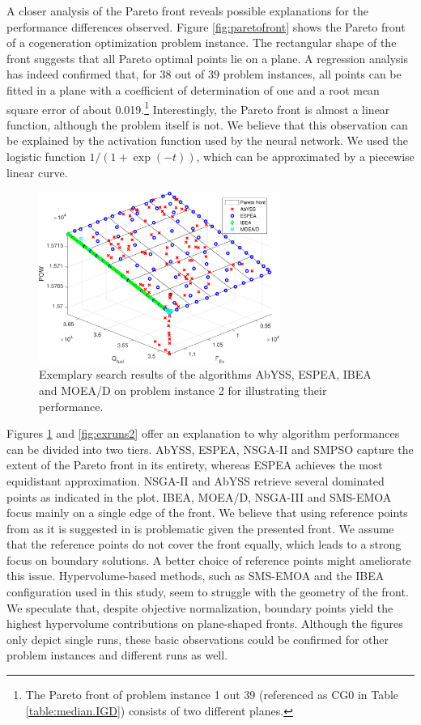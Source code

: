 A closer analysis of the Pareto front reveals possible explanations for the performance differences observed. Figure \ref{fig:paretofront} shows the Pareto front of a cogeneration optimization problem instance. The rectangular shape of the front suggests that all Pareto optimal points lie on a plane. A regression analysis has indeed confirmed that, for 38 out of 39 problem instances, all points can be fitted in a plane with a coefficient of determination of one and a root mean square error of about 0.019.\footnote{The Pareto front of problem instance 1 out 39 (referenced as CG0 in Table \ref{table:median.IGD}) consists of two different planes.} Interestingly, the Pareto front is almost a linear function, although the problem itself is not. We believe that this observation can be explained by the activation function used by the neural network. We used the logistic function $1/(1+\exp(-t))$, which can be approximated by a piecewise linear curve.

\begin{figure}
\centering
\includegraphics[width=0.7\textwidth]{figures/example1_cropped.pdf}
\caption{Exemplary search results of the algorithms AbYSS, ESPEA, IBEA and MOEA/D on problem instance 2 for illustrating their performance.}
\label{fig:exruns1}
\end{figure}

Figures \ref{fig:exruns1} and \ref{fig:exruns2} offer an explanation to why algorithm performances can be divided into two tiers. AbYSS, ESPEA, NSGA-II and SMPSO capture the extent of the Pareto front in its entirety, whereas ESPEA achieves the most equidistant approximation. NSGA-II and AbYSS retrieve several dominated points as indicated in the plot. IBEA, MOEA/D, NSGA-III and SMS-EMOA focus mainly on a single edge of the front. We believe that using reference points from \cite{nbi} as it is suggested in \cite{moead2009,nsga3part1} is problematic given the presented front. We assume that the reference points do not cover the front equally, which leads to a strong focus on boundary solutions. A better choice of reference points might ameliorate this issue. Hypervolume-based methods, such as SMS-EMOA and the IBEA configuration used in this study, seem to struggle with the geometry of the front. We speculate that, despite objective normalization, boundary points yield the highest hypervolume contributions on plane-shaped fronts. Although the figures only depict single runs, these basic observations could be confirmed for other problem instances and different runs as well.

